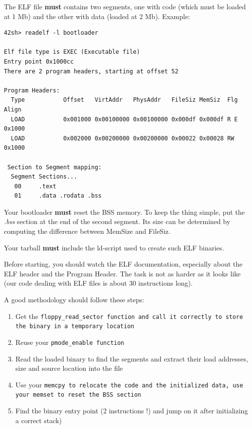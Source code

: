 The ELF file \textbf{must} contains two segments, one with code (which
must be loaded at 1 Mb) and the other with data (loaded at 2
Mb). Example:

\begin{verbatim}
42sh> readelf -l bootloader

Elf file type is EXEC (Executable file)
Entry point 0x1000cc
There are 2 program headers, starting at offset 52

Program Headers:
  Type           Offset   VirtAddr   PhysAddr   FileSiz MemSiz  Flg Align
  LOAD           0x001000 0x00100000 0x00100000 0x000df 0x000df R E 0x1000
  LOAD           0x002000 0x00200000 0x00200000 0x00022 0x00028 RW  0x1000

 Section to Segment mapping:
  Segment Sections...
   00     .text
   01     .data .rodata .bss
\end{verbatim}

Your bootloader \textbf{must} reset the BSS memory. To keep the thing
simple, put the \emph{.bss} section at the end of the second
segment. Its size can be determined by computing the difference
between MemSize and FileSiz.

Your tarball \textbf{must} include the ld-script used to create such
ELF binaries.

Before starting, you should watch the ELF documentation, especially
about the ELF header and the Program Header. The task is not as harder
as it looks like (our code dealing with ELF files is about 30
instructions long).

A good methodology should follow these steps:

  \begin{enumerate}

    \item {Get the \tt floppy\_read\_sector \rm function and call it
    correctly to store the binary in a temporary location}

    \item {Reuse your \tt pmode\_enable \rm function}

    \item {Read the loaded binary to find the segments and extract
    their load addresses, size and source location into the file}

    \item {Use your \tt memcpy \rm to relocate the code and the
    initialized data, use your \tt memset \rm to reset the BSS section}

    \item {Find the binary entry point (2 instructions !) and jump on
    it after initializing a correct stack)}

  \end{enumerate}

